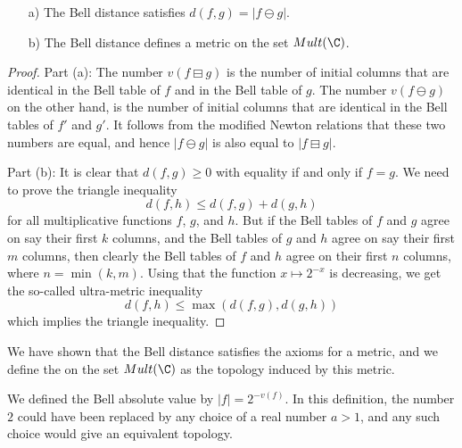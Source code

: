 \documentclass[a4paper]{article}
\begin{document}
\begin{lemma}
\begin{itemize}
\item[a)] The Bell distance satisfies $d(f, g) = \vert f \ominus g \vert$.
\item[b)] The Bell distance defines a metric on the set $Mult(\C)$.
\end{itemize}
\end{lemma}

\begin{proof}
Part (a): The number $v( f \boxminus g)$ is the number of initial columns that are identical in the Bell table of $f$ and in the Bell table of $g$. The number $v( f \ominus g)$ on the other hand, is the number of initial columns that are identical in the Bell tables of $f'$ and $g'$. It follows from the modified Newton relations that these two numbers are equal, and hence $\vert f \ominus g \vert$ is also equal to $\vert f \boxminus g \vert$.

Part (b): It is clear that $d(f, g) \geq 0$ with equality if and only if $f=g$. We need to prove the triangle inequality
$$  d(f, h)  \leq d(f, g) + d(g, h)   $$
for all multiplicative functions $f$, $g$, and $h$. But if the Bell tables of $f$ and $g$ agree on say their first $k$ columns, and the Bell tables of $g$ and $h$ agree on say their first $m$ columns, then clearly the Bell tables of $f$ and $h$ agree on their first $n$ columns, where $n = \min(k, m)$. Using that the function $x \mapsto 2^{-x}$ is decreasing, we get the so-called ultra-metric inequality
$$   d(f, h)  \leq \max (d(f, g) , d(g, h)  )    $$
which implies the triangle inequality.
\end{proof}

\begin{definition}
We have shown that the Bell distance satisfies the axioms for a metric, and we define the  on the set $Mult(\C)$ as the topology induced by this metric. 
\end{definition}

\begin{remark}
We defined the Bell absolute value by $\vert f \vert = 2^{-v(f)}$. In this definition, the number $2$ could have been replaced by any choice of a real number $a > 1$, and any such choice would give an equivalent topology.
\end{remark}




\end{document}
